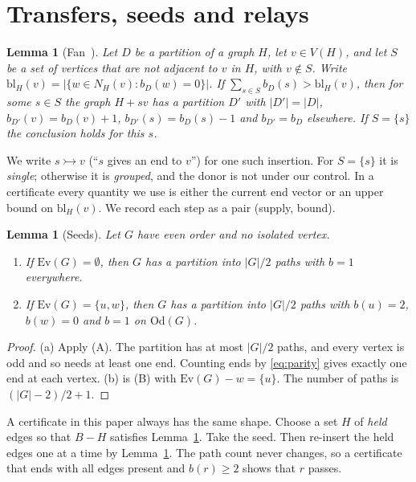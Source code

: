 \documentclass[11pt]{amsart}
\newtheorem{lemma}[theorem]{Lemma}
\theoremstyle{definition}
\newcommand{\Ev}{\mathrm{Ev}}
\newcommand{\Od}{\mathrm{Od}}
\newcommand{\tr}{\rightarrowtail}   %
\newcommand{\bl}{\mathrm{bl}}
\begin{document}
\section{Transfers, seeds and relays}\label{sec:tools}

\begin{lemma}[Fan~\cite{Fan}]\label{lem:fan}
Let $D$ be a partition of a graph $H$, let $v\in V(H)$, and let $S$ be a set of vertices that are
not adjacent to $v$ in $H$, with $v\notin S$. Write
$\bl_H(v)=|\{w\in N_H(v):b_D(w)=0\}|$. If $\sum_{s\in S}b_D(s)>\bl_H(v)$, then for some $s\in S$
the graph $H+sv$ has a partition $D'$ with $|D'|=|D|$, $b_{D'}(v)=b_D(v)+1$,
$b_{D'}(s)=b_D(s)-1$ and $b_{D'}=b_D$ elsewhere. If $S=\{s\}$ the conclusion holds for this $s$.
\end{lemma}

We write $s\tr v$ (``$s$ gives an end to $v$'') for one such insertion. For $S=\{s\}$ it is
\emph{single}; otherwise it is \emph{grouped}, and the donor is not under our control. In a
certificate every quantity we use is either the current end vector or an upper bound on
$\bl_H(v)$. We record each step as a pair (supply, bound).

\begin{lemma}[Seeds]\label{lem:seeds}
Let $G$ have even order and no isolated vertex.
\begin{enumerate}[label=(\alph*)]
\item If $\Ev(G)=\emptyset$, then $G$ has a partition into $|G|/2$ paths with $b=1$ everywhere.
\item If $\Ev(G)=\{u,w\}$, then $G$ has a partition into $|G|/2$ paths with $b(u)=2$, $b(w)=0$ and
$b=1$ on $\Od(G)$.
\end{enumerate}
\end{lemma}
\begin{proof}
(a) Apply (A). The partition has at most $|G|/2$ paths, and every vertex is odd and so needs at
least one end. Counting ends by \eqref{eq:parity} gives exactly one end at each vertex. (b) is (B)
with $\Ev(G)-w=\{u\}$. The number of paths is $(|G|-2)/2+1$.
\end{proof}

A certificate in this paper always has the same shape. Choose a set $H$ of \emph{held} edges so
that $B-H$ satisfies Lemma~\ref{lem:seeds}. Take the seed. Then re-insert the held edges one at a
time by Lemma~\ref{lem:fan}. The path count never changes, so a certificate that ends with all
edges present and $b(r)\ge2$ shows that $r$ passes.
\end{document}

